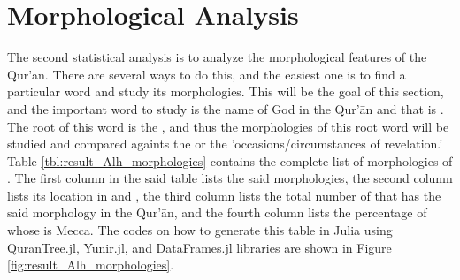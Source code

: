 \section{Morphological Analysis}\label{sec:ch4_morphological_analysis}
The second statistical analysis is to analyze the morphological features of the Qur'\=an. There are several ways to do this, and the easiest one is to find a particular word and study its morphologies. This will be the goal of this section, and the important word to study is the name of God in the Qur'\=an and that is  . The root of this word is the  , and thus the morphologies of this root word will be studied and compared againts the   or the 'occasions/circumstances of revelation.' Table \ref{tbl:result_Alh_morphologies} contains the complete list of morphologies of  . The first column in the said table lists the said morphologies, the second column lists its location in   and  , the third column lists the total number of   that has the said morphology in the Qur'\=an, and the fourth column lists the percentage of   whose   is Mecca. The codes on how to generate this table in Julia using QuranTree.jl, Yunir.jl, and DataFrames.jl libraries are shown in Figure \ref{fig:result_Alh_morphologies}.

